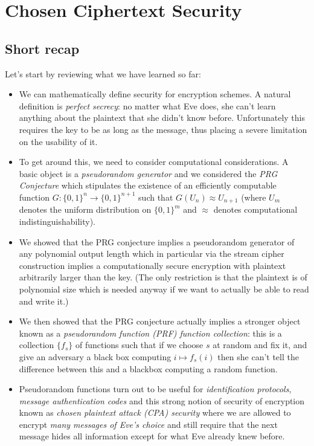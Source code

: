 \chapter{Chosen Ciphertext Security}\label{Chosen-Ciphertext-Security}

\section{Short recap}\label{Short-recap}

Let's start by reviewing what we have learned so far:

\begin{itemize}
\item
  We can mathematically define security for encryption schemes. A
  natural definition is \emph{perfect secrecy}: no matter what Eve does,
  she can't learn anything about the plaintext that she didn't know
  before. Unfortunately this requires the key to be as long as the
  message, thus placing a severe limitation on the usability of it.
\item
  To get around this, we need to consider computational considerations.
  A basic object is a \emph{pseudorandom generator} and we considered
  the \emph{PRG Conjecture} which stipulates the existence of an
  efficiently computable function
  \(G:\{0,1\}^n\rightarrow\{0,1\}^{n+1}\) such that
  \(G(U_n)\approx U_{n+1}\) (where \(U_m\) denotes the uniform
  distribution on \(\{0,1\}^m\) and \(\approx\) denotes computational
  indistinguishability).
\item
  We showed that the PRG conjecture implies a pseudorandom generator of
  any polynomial output length which in particular via the stream cipher
  construction implies a computationally secure encryption with
  plaintext arbitrarily larger than the key. (The only restriction is
  that the plaintext is of polynomial size which is needed anyway if we
  want to actually be able to read and write it.)
\item
  We then showed that the PRG conjecture actually implies a stronger
  object known as a \emph{pseudorandom function (PRF) function
  collection}: this is a collection \(\{ f_s \}\) of functions such that
  if we choose \(s\) at random and fix it, and give an adversary a black
  box computing \(i \mapsto f_s(i)\) then she can't tell the difference
  between this and a blackbox computing a random function.
\item
  Pseudorandom functions turn out to be useful for \emph{identification
  protocols}, \emph{message authentication codes} and this strong notion
  of security of encryption known as \emph{chosen plaintext attack (CPA)
  security} where we are allowed to encrypt \emph{many messages of Eve's
  choice} and still require that the next message hides all information
  except for what Eve already knew before.
\end{itemize}

